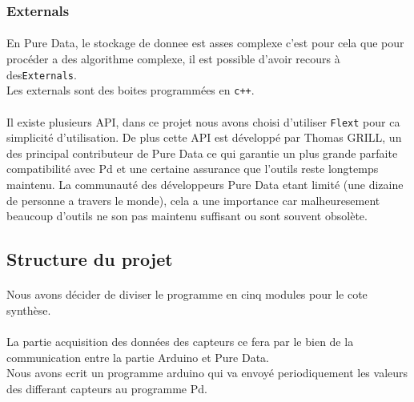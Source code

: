 \documentclass[a4paper, titlepage, oneside, 12pt]{article}%
\begin{document}
\subsubsection{Externals}
\paragraph{}
En Pure Data, le stockage de donnee est asses complexe c'est pour cela que pour procéder a des algorithme complexe, il est possible d'avoir recours à des\texttt{Externals}.\\
Les externals sont des boites programmées en \texttt{c++}. 

\paragraph{}
Il existe plusieurs API, dans ce projet nous avons choisi d'utiliser \texttt{Flext} pour ca simplicité d'utilisation. De plus cette API est développé par Thomas GRILL, un des principal contributeur de Pure Data ce qui garantie un plus grande parfaite compatibilité avec Pd et une certaine assurance que l'outils reste longtemps maintenu. La communauté des développeurs Pure Data etant limité (une dizaine de personne a travers le monde), cela a une importance car malheuresement beaucoup d'outils ne son pas maintenu suffisant ou sont souvent obsolète.  


\subsection{Structure du projet}
\paragraph{}
Nous avons décider de diviser le programme en cinq modules pour le cote synthèse.\\

\paragraph{}
La partie acquisition des données des capteurs ce fera par le bien de la communication entre la partie Arduino et Pure Data.\\
Nous avons ecrit un programme arduino qui va envoyé periodiquement les valeurs des differant capteurs au programme Pd.
\end{document}
